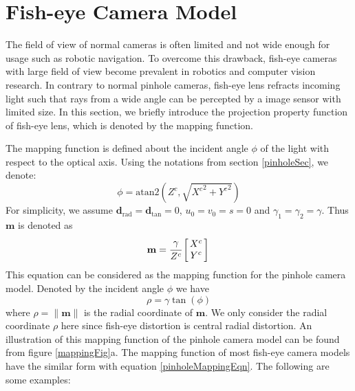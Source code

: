 \documentclass{report}
\begin{document}
\section{Fish-eye Camera Model}
The field of view of normal cameras is often limited and not wide enough for usage such as robotic navigation. To overcome this drawback, fish-eye cameras with large field of view become prevalent in robotics and computer vision research. In contrary to normal pinhole cameras, fish-eye lens refracts incoming light such that rays from a wide angle can be percepted by a image sensor with limited size. In this section, we briefly introduce the projection property function of fish-eye lens, which is denoted by the mapping function. 

The mapping function is defined about the incident angle $\phi$ of the light with respect to the optical axis. Using the notations from section \ref{pinholeSec}, we denote: 
\begin{equation}
\phi = \text{atan2} (Z^c, \sqrt{{X^c}^2 + {Y^c}^2})
\end{equation}
For simplicity, we assume $\mathbf{d}_\text{rad} = \mathbf{d}_\text{tan} = 0$, $u_0 = v_0 = s = 0$ and $\gamma_1 = \gamma_2 = \gamma$. Thus $\mathbf{m}$ is denoted as
\begin{equation}
\mathbf{m} = \cfrac{\gamma}{Z^c}
\arraycolsep=1.5pt%
\begin{bmatrix}
\begin{array}{c}
X^c \\ Y^c
\end{array}
\end{bmatrix} \\
\end{equation}
This equation can be considered as the mapping function for the pinhole camera model. Denoted by the incident angle $\phi$ we have 
\begin{equation}
\rho = \gamma \tan(\phi)
\label{pinholeMappingEqn}
\end{equation}
where $\rho = \|\mathbf{m}\|$ is the radial coordinate of $\mathbf{m}$. We only consider the radial coordinate $\rho$ here since fish-eye distortion is central radial distortion. An illustration of this mapping function of the pinhole camera model can be found from figure \ref{mappingFig}a. The mapping function of most fish-eye camera models have the similar form with equation \ref{pinholeMappingEqn}. The following are some examples: 
\end{document}
